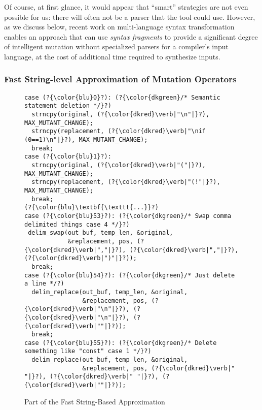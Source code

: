Of course, at first
glance, it would appear that  ``smart'' strategies are not even
possible for us: there will often not be a parser that the
tool could use.  However, as we discuss below, recent work on
multi-language syntax transformation~\cite{combypaper} enables an approach that can use
\emph{syntax fragments} to provide a significant degree of intelligent
mutation without specialized parsers for a compiler's input language,
at the cost of additional time required to synthesize inputs.

\begin{sloppypar}
\subsubsection{Fast String-level Approximation of Mutation Operators}
\label{strat-fast-string-level}

\begin{figure}[h!]
\begin{lstlisting}[basicstyle=\scriptsize\ttfamily,numbers=none,xleftmargin=0.7em,xrightmargin=.7em]
case (?{\color{blu}0}?): (?{\color{dkgreen}/* Semantic statement deletion */}?)
  strncpy(original, (?{\color{dkred}\verb|"\n"|}?), MAX_MUTANT_CHANGE);
  strncpy(replacement, (?{\color{dkred}\verb|"\nif (0==1)\n"|}?), MAX_MUTANT_CHANGE);
  break;
case (?{\color{blu}1}?):
  strncpy(original, (?{\color{dkred}\verb|"("|}?), MAX_MUTANT_CHANGE);
  strncpy(replacement, (?{\color{dkred}\verb|"(!"|}?), MAX_MUTANT_CHANGE);
  break;
(?{\color{blu}\textbf{\texttt{...}}?)
case (?{\color{blu}53}?): (?{\color{dkgreen}/* Swap comma delimited things case 4 */}?)
 delim_swap(out_buf, temp_len, &original, 
            &replacement, pos, (?{\color{dkred}\verb|","|}?), (?{\color{dkred}\verb|","|}?), (?{\color{dkred}\verb|")"|}?));
  break;
case (?{\color{blu}54}?): (?{\color{dkgreen}/* Just delete a line */?)
  delim_replace(out_buf, temp_len, &original, 
                &replacement, pos, (?{\color{dkred}\verb|"\n"|}?), (?{\color{dkred}\verb|"\n"|}?), (?{\color{dkred}\verb|""|}?));
  break;
case (?{\color{blu}55}?): (?{\color{dkgreen}/* Delete something like "const" case 1 */}?)
  delim_replace(out_buf, temp_len, &original, 
                &replacement, pos, (?{\color{dkred}\verb|" "|}?), (?{\color{dkred}\verb|" "|}?), (?{\color{dkred}\verb|""|}?));
\end{lstlisting}
\caption{Part of the Fast String-Based Approximation}
\label{fig:foperators}
\end{figure}


\end{sloppypar}
